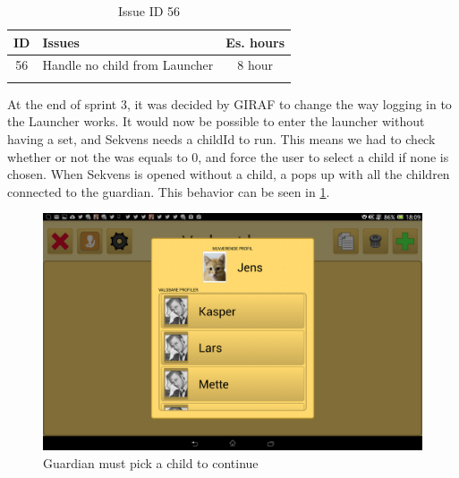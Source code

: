 \clearpage
\begin{longtable} { | c | p{12cm} | c | } 
\hline
	ID 	&	Issues	&		 Es. hours \\\hline
	56	&	Handle no child from Launcher	&	8 hour	\\\hline
\caption{Issue ID 56}
\label{tab:spr4_nochildfromlauncher}
\end{longtable}

At the end of sprint 3, it was decided by GIRAF to change the way logging in to the Launcher works. It would now be possible to enter the launcher without having a  set, and Sekvens needs a childId to run. This means we had to check whether or not the  was equals to 0, and force the user to select a child if none is chosen. When Sekvens is opened without a child, a  pops up with all the children connected to the guardian. This behavior can be seen in \ref{fig:profileselector}.

\begin{figure}[H]
	\centering
	\includegraphics[width=\textwidth]{Pics/Sprint4/profileselector.png}
	\caption{Guardian must pick a child to continue}
	\label{fig:profileselector}
\end{figure}